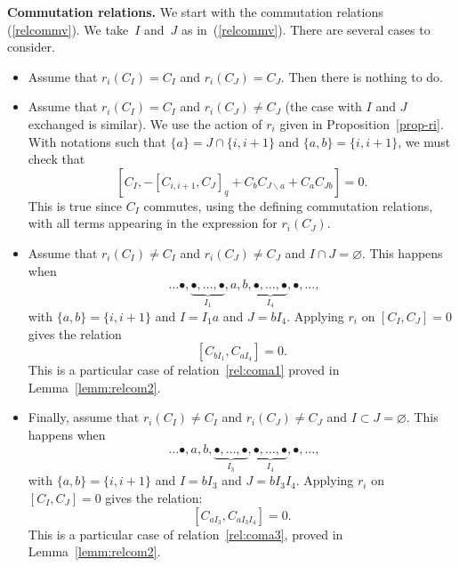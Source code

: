 \documentclass[pdftex]{sigma}
\numberwithin{equation}{section}
\theoremstyle{definition}
\begin{document}
{\bf Commutation relations.} We start with the commutation relations (\ref{relcommv}). We take~$I$ and~$J$ as in~(\ref{relcommv}). There are several cases to consider.
\begin{itemize}\itemsep=0pt
\item Assume that $r_i(C_I)=C_I$ and $r_i(C_J)=C_J$. Then there is nothing to do.

\item Assume that $r_i(C_I)=C_I$ and $r_i(C_J)\neq C_J$ (the case with $I$ and $J$ exchanged is similar). We use the action of $r_i$ given in Proposition~\ref{prop-ri}. With notations such that $\{a\}=J\cap \{i,i+1\}$ and $\{a,b\}=\{i,i+1\}$, we must check that
\[[C_I, -[C_{i,i+1},C_{J}]_q+C_bC_{J\backslash a}+C_{a}C_{Jb}]=0 .\]
This is true since $C_I$ commutes, using the defining commutation relations, with all terms appearing in the expression for $r_i(C_J)$.

\item Assume that $r_i(C_I)\neq C_I$ and $r_i(C_J)\neq C_J$ and $I\cap J=\varnothing$. This happens when
\[\ \ \ldots \bullet,\underbrace{\bullet,\dots,\bullet}_{I_1},a,b,\underbrace{\bullet,\dots,\bullet}_{I_4},\bullet,\ldots ,\]
with $\{a,b\}=\{i,i+1\}$ and $I=I_1a$ and $J=bI_4$. Applying $r_i$ on $[C_I,C_J]=0$ gives the relation
\[[C_{bI_1},C_{aI_4}]=0 .\]
This is a particular case of relation~\eqref{rel:coma1} proved in Lemma~\ref{lemm:relcom2}.

\item Finally, assume that $r_i(C_I)\neq C_I$ and $r_i(C_J)\neq C_J$ and $I\subset J=\varnothing$. This happens when
\[\ \ \ldots \bullet,a,b,\underbrace{\bullet,\dots,\bullet}_{I_3},\underbrace{\bullet,\dots,\bullet}_{I_4},\bullet,\ldots ,\]
with $\{a,b\}=\{i,i+1\}$ and $I=bI_3$ and $J=bI_3I_4$. Applying $r_i$ on $[C_I,C_J]=0$ gives the relation:
\[[C_{aI_3},C_{aI_3I_4}]=0 .\]
This is a particular case of relation~\eqref{rel:coma3}, proved in Lemma~\ref{lemm:relcom2}.
\end{itemize}
\end{document}
